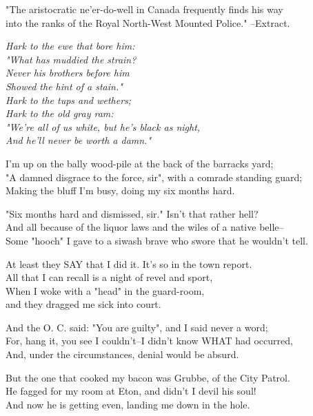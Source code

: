 
\begin{poemblock}
"The aristocratic ne'er-do-well in Canada frequently finds his way\\
into the ranks of the Royal North-West Mounted Police." --Extract.

\indentedblock\itshape{
Hark to the ewe that bore him:\\
\idt "What has muddied the strain?\\
Never his brothers before him\\
\idt  Showed the hint of a stain."\\
Hark to the tups and wethers;\\
\idt  Hark to the old gray ram:\\
"We're all of us white, but he's black as night,\\
\idt  And he'll never be worth a damn."
}

I'm up on the bally wood-pile at the back of the barracks yard;\\
"A damned disgrace to the force, sir", with a comrade standing guard;\\
Making the bluff I'm busy, doing my six months hard.

"Six months hard and dismissed, sir."  Isn't that rather hell?\\
And all because of the liquor laws and the wiles of a native belle--\\
Some "hooch" I gave to a siwash brave who swore that he wouldn't tell.

At least they SAY that I did it.  It's so in the town report.\\
All that I can recall is a night of revel and sport,\\
When I woke with a "head" in the guard-room,\\
\idt and they dragged me sick into court.

And the O. C. said:  "You are guilty", and I said never a word;\\
For, hang it, you see I couldn't--I didn't know WHAT had occurred,\\
And, under the circumstances, denial would be absurd.

But the one that cooked my bacon was Grubbe, of the City Patrol.\\
He fagged for my room at Eton, and didn't I devil his soul!\\
And now he is getting even, landing me down in the hole.


\end{poemblock}
